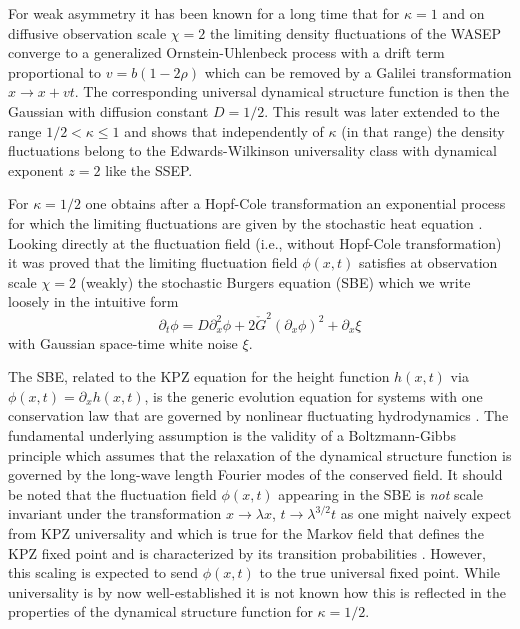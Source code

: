 \documentclass[12pt]{article}
\begin{document}
For weak asymmetry it has been known for a long time that for 
$\kappa =1$ and on diffusive observation scale $\chi=2$ the 
limiting density fluctuations of the WASEP converge to a generalized 
Ornstein-Uhlenbeck process \cite{DeMa89,Ditt91} with a drift 
term proportional to $v=b (1-2\rho)$ which can be removed by 
a Galilei transformation $x \to x+vt$. The corresponding universal
dynamical structure function is then the Gaussian with diffusion 
constant $D=1/2$. This result was later extended to the range 
$1/2<\kappa \leq 1$ \cite{Gonc12} and shows that independently
of $\kappa$ (in that range) the density fluctuations belong to the 
Edwards-Wilkinson universality class 
\cite{Edwa82} with dynamical exponent $z=2$ like the SSEP. 

For $\kappa=1/2$ one obtains after a Hopf-Cole transformation 
\cite{Gart88} an exponential process for which the limiting 
fluctuations are given by the stochastic heat equation \cite{Bert97}. 
Looking directly at the fluctuation field (i.e., without Hopf-Cole 
transformation) it was proved \cite{Gonc12} that the limiting  
fluctuation field $\phi(x,t)$ satisfies at observation
scale $\chi=2$  (weakly) the 
stochastic Burgers equation (SBE) which we write loosely in the 
intuitive form 
\begin{equation}
\partial_t \phi = D \partial_x^2 \phi + 2 \check{G}^2 (\partial_x \phi)^2
+  \partial_x \xi
\label{SBE}
\end{equation}
with Gaussian space-time white noise $\xi$.

The SBE, related to the KPZ equation \cite{Kard86} for the height
function $h(x,t)$ via $\phi(x,t)=\partial_x h(x,t)$, is the generic 
evolution equation for systems with one conservation law that are 
governed by nonlinear fluctuating hydrodynamics \cite{Spoh91}. The 
fundamental underlying assumption is the validity of a 
Boltzmann-Gibbs principle which assumes that the relaxation of the 
dynamical structure function is governed by the long-wave length 
Fourier modes of the conserved field. It should be noted that the 
fluctuation field $\phi(x,t)$ appearing in the SBE is {\it not} scale 
invariant under the transformation $x\to\lambda x$, 
$t\to\lambda^{3/2}t$ as one might naively expect from KPZ 
universality and which is true for the Markov field that defines the 
KPZ fixed point and is characterized by its transition probabilities 
\cite{Mate21}. However, this scaling is expected to send $\phi(x,t)$ 
to the true universal fixed point. While universality is by now 
well-established \cite{Quas23} it is not known how this is reflected 
in the properties of the dynamical structure function for $\kappa=1/2$.
\end{document}
